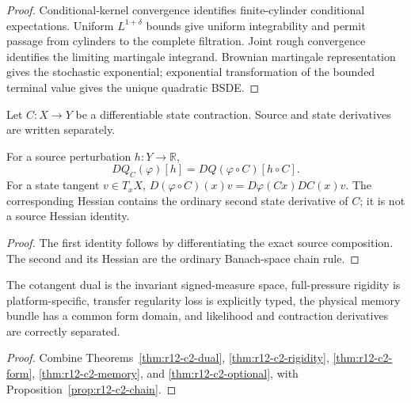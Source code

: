 \begin{proof}
Conditional-kernel convergence identifies finite-cylinder conditional
expectations.  Uniform $L^{1+\delta}$ bounds give uniform integrability and
permit passage from cylinders to the complete filtration.  Joint rough
convergence identifies the limiting martingale integrand.  Brownian martingale
representation gives the stochastic exponential; exponential transformation
of the bounded terminal value gives the unique quadratic BSDE.
\end{proof}

Let $C:X\to Y$ be a differentiable state contraction.  Source and state
derivatives are written separately.

\begin{proposition}
\label{prop:r12-c2-chain}
For a source perturbation $h:Y\to\mathbb R$,
\[
 DQ_C(\varphi)[h]=DQ(\varphi\circ C)[h\circ C].
\]
For a state tangent $v\in T_xX$,
$D(\varphi\circ C)(x)v=D\varphi(Cx)DC(x)v$.  The corresponding Hessian
contains the ordinary second state derivative of $C$; it is not a source
Hessian identity.
\end{proposition}

\begin{proof}
The first identity follows by differentiating the exact source composition.
The second and its Hessian are the ordinary Banach-space chain rule.
\end{proof}

\begin{theorem}
\label{thm:r12-c2-main}
The cotangent dual is the invariant signed-measure space, full-pressure
rigidity is platform-specific, transfer regularity loss is explicitly typed,
the physical memory bundle has a common form domain, and likelihood and
contraction derivatives are correctly separated.
\end{theorem}

\begin{proof}
Combine Theorems~\ref{thm:r12-c2-dual},
\ref{thm:r12-c2-rigidity}, \ref{thm:r12-c2-form},
\ref{thm:r12-c2-memory}, and \ref{thm:r12-c2-optional}, with
Proposition~\ref{prop:r12-c2-chain}.
\end{proof}
